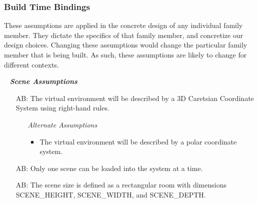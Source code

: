 \documentclass[12pt]{article}
\newcounter{assumpnum} %
\newcounter{assumpnumB} %
\begin{document}
\subsubsection{Build Time Bindings}
These assumptions are applied in the concrete design of any individual family 
member. They dictate the specifics of that family member, and concretize our 
design choices. Changing these assumptions would change the particular family 
member that is being built. As such, these assumptions are likely to change for 
different contexts.

~\newline
\textbf{\emph{Scene Assumptions}}
\begin{itemize}
	\item[AB\refstepcounter{assumpnumB}\theassumpnumB\label{as-coordinate_system}:]
	The virtual environment will be described by a 3D Caretsian Coordinate 
	System using right-hand rules.
	\begin{itemize}
		\item[] \textit{Alternate Assumptions}
		\begin{itemize}
			\item The virtual environment will be described by a polar 
			coordinate system.
		\end{itemize}
	\end{itemize}
	\item[AB\refstepcounter{assumpnumB}\theassumpnumB\label{as-number-scenes}:]
	Only one scene can be loaded into the system at a time.
	\item[AB\refstepcounter{assumpnumB}\theassumpnumB\label{as-scenes-size}:]
	The scene size is defined as a rectangular room with dimensions 
	SCENE\_HEIGHT, SCENE\_WIDTH, and SCENE\_DEPTH.
\end{itemize}
\end{document}
